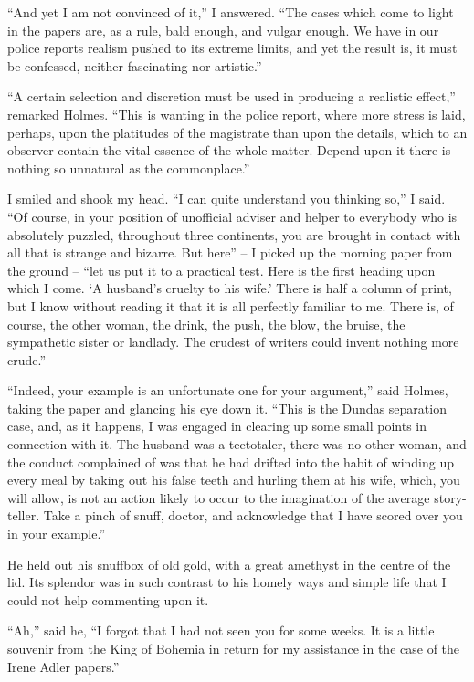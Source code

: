 “And yet I am not convinced of it,” I answered. “The
cases which come to light in the papers are, as a rule, bald
enough, and vulgar enough. We have in our police reports
realism pushed to its extreme limits, and yet the result is, it
must be confessed, neither fascinating nor artistic.”

“A certain selection and discretion must be used in producing
a realistic effect,” remarked Holmes. “This is wanting
in the police report, where more stress is laid, perhaps,
upon the platitudes of the magistrate than upon the details,
which to an observer contain the vital essence of the whole
matter. Depend upon it there is nothing so unnatural as the
commonplace.”

I smiled and shook my head. “I can quite understand you
thinking so,” I said. “Of course, in your position of
unofficial adviser and helper to everybody who is absolutely
puzzled, throughout three continents, you are brought in contact
with all that is strange and bizarre. But here” -- I picked
up the morning paper from the ground -- “let us put it to a
practical test. Here is the first heading upon which I come.
‘A husband’s cruelty to his wife.’ There is half a column
of print, but I know without reading it that it is all perfectly
familiar to me. There is, of course, the other woman, the
drink, the push, the blow, the bruise, the sympathetic sister
or landlady. The crudest of writers could invent nothing
more crude.”

“Indeed, your example is an unfortunate one for your argument,”
said Holmes, taking the paper and glancing his eye
down it. “This is the Dundas separation case, and, as it
happens, I was engaged in clearing up some small points in
connection with it. The husband was a teetotaler, there was no
other woman, and the conduct complained of was that he had
drifted into the habit of winding up every meal by taking out
his false teeth and hurling them at his wife, which, you will
allow, is not an action likely to occur to the imagination of the
average story-teller. Take a pinch of snuff, doctor, and
acknowledge that I have scored over you in your example.”

He held out his snuffbox of old gold, with a great amethyst
in the centre of the lid. Its splendor was in such contrast to
his homely ways and simple life that I could not help commenting
upon it.

“Ah,” said he, “I forgot that I had not seen you for some
weeks. It is a little souvenir from the King of Bohemia in
return for my assistance in the case of the Irene Adler
papers.”

